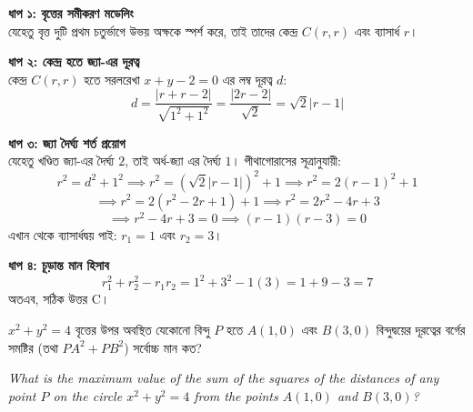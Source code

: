 \documentclass[12pt, a4paper]{article}
\begin{document}
\begin{tcolorbox}[solutionbox={সমাধান (Solution)}]
    \noindent
    \textbf{ধাপ ১: বৃত্তের সমীকরণ মডেলিং} \\
    যেহেতু বৃত্ত দুটি প্রথম চতুর্ভাগে উভয় অক্ষকে স্পর্শ করে, তাই তাদের কেন্দ্র $C(r, r)$ এবং ব্যাসার্ধ $r$।
    
    \vspace{0.5em}
    \noindent\textbf{ধাপ ২: কেন্দ্র হতে জ্যা-এর দূরত্ব} \\
    কেন্দ্র $C(r, r)$ হতে সরলরেখা $x + y - 2 = 0$ এর লম্ব দূরত্ব $d$:
    \[ d = \frac{|r + r - 2|}{\sqrt{1^2 + 1^2}} = \frac{|2r - 2|}{\sqrt{2}} = \sqrt{2}|r - 1| \]
    
    \vspace{0.5em}
    \noindent\textbf{ধাপ ৩: জ্যা দৈর্ঘ্য শর্ত প্রয়োগ} \\
    যেহেতু খণ্ডিত জ্যা-এর দৈর্ঘ্য $2$, তাই অর্ধ-জ্যা এর দৈর্ঘ্য $1$। পীথাগোরাসের সূত্রানুযায়ী:
    \[ r^2 = d^2 + 1^2 \implies r^2 = (\sqrt{2}|r - 1|)^2 + 1 \implies r^2 = 2(r-1)^2 + 1 \]
    \[ \implies r^2 = 2(r^2 - 2r + 1) + 1 \implies r^2 = 2r^2 - 4r + 3 \]
    \[ \implies r^2 - 4r + 3 = 0 \implies (r-1)(r-3) = 0 \]
    এখান থেকে ব্যাসার্ধদ্বয় পাই: $r_1 = 1$ এবং $r_2 = 3$।
    
    \vspace{0.5em}
    \noindent\textbf{ধাপ ৪: চূড়ান্ত মান হিসাব} \\
    \[ r_1^2 + r_2^2 - r_1 r_2 = 1^2 + 3^2 - 1(3) = 1 + 9 - 3 = 7 \]
    অতএব, সঠিক উত্তর C।
\end{tcolorbox}
\begin{tcolorbox}[questionbox={প্রশ্ন (Question) 18}]
    \noindent
    $x^2 + y^2 = 4$ বৃত্তের উপর অবস্থিত যেকোনো বিন্দু $P$ হতে $A(1, 0)$ এবং $B(3, 0)$ বিন্দুদ্বয়ের দূরত্বের বর্গের সমষ্টির (তথা $PA^2 + PB^2$) সর্বোচ্চ মান কত?
    
    \vspace{0.8em}
    \begin{english}
    \noindent\textit{\color{darkgray}
    What is the maximum value of the sum of the squares of the distances of any point $P$ on the circle $x^2 + y^2 = 4$ from the points $A(1, 0)$ and $B(3, 0)$?
    }
    \end{english}
\end{tcolorbox}
\end{document}
